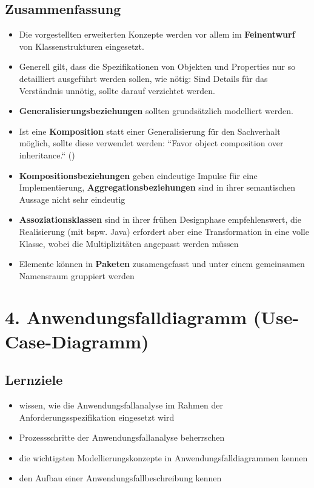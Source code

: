 \subsection*{Zusammenfassung}

\begin{itemize}
    \item Die vorgestellten erweiterten Konzepte werden vor allem im \textbf{Feinentwurf} von Klassenstrukturen eingesetzt.
    \item Generell gilt, dass die Spezifikationen von Objekten und Properties nur so detailliert ausgeführt werden sollen, wie nötig: Sind Details für das Verständnis unnötig, sollte darauf verzichtet werden.
    \item \textbf{Generalisierungsbeziehungen} sollten grundsätzlich modelliert werden.
    \item Ist eine \textbf{Komposition} statt einer Generalisierung für den Sachverhalt möglich, sollte diese verwendet werden: ``Favor object composition over inheritance.`` (\cite[19 f.]{GHJV94})
    \item \textbf{Kompositionsbeziehungen} geben eindeutige Impulse für eine Implementierung, \textbf{Aggregationsbeziehungen} sind in ihrer semantischen Aussage nicht sehr eindeutig
    \item \textbf{Assoziationsklassen} sind in ihrer frühen Designphase empfehlenswert, die Realisierung (mit {bspw.} Java) erfordert aber eine Transformation in eine volle Klasse, wobei die Multiplizitäten angepasst werden müssen
    \item Elemente können in \textbf{Paketen} zusamengefasst und unter einem gemeinsamen Namensraum gruppiert werden
\end{itemize}

\section*{4. Anwendungsfalldiagramm (Use-Case-Diagramm)}

\subsection*{Lernziele}
\begin{itemize}
    \item wissen, wie die Anwendungsfallanalyse im Rahmen der Anforderungsspezifikation eingesetzt wird
    \item Prozessschritte der Anwendungsfallanalyse beherrschen
    \item die wichtigsten Modellierungskonzepte in Anwendungsfalldiagrammen kennen
    \item den Aufbau einer Anwendungsfallbeschreibung kennen
\end{itemize}

